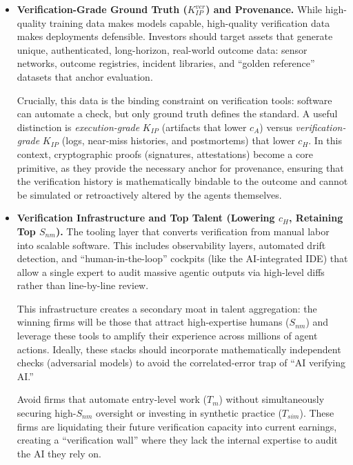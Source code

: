 \documentclass[12pt, letter]{article}
\begin{document}
\begin{itemize}

    \item \textbf{Verification-Grade Ground Truth ($K_{IP}^{ver}$) and Provenance.} While high-quality training data makes models capable, high-quality verification data makes deployments defensible. Investors should target assets that generate unique, authenticated, long-horizon, real-world outcome data: sensor networks, outcome registries, incident libraries, and ``golden reference'' datasets that anchor evaluation.

    Crucially, this data is the binding constraint on verification tools: software can automate a check, but only ground truth defines the standard. A useful distinction is \emph{execution-grade} $K_{IP}$ (artifacts that lower $c_A$) versus \emph{verification-grade} $K_{IP}$ (logs, near-miss histories, and postmortems) that lower $c_H$. In this context, cryptographic proofs (signatures, attestations) become a core primitive, as they provide the necessary anchor for provenance, ensuring that the verification history is mathematically bindable to the outcome and cannot be simulated or retroactively altered by the agents themselves.

    \item \textbf{Verification Infrastructure and Top Talent (Lowering $c_H$, Retaining Top $S_{nm}$).} The tooling layer that converts verification from manual labor into scalable software. This includes observability layers, automated drift detection, and ``human-in-the-loop'' cockpits (like the AI-integrated IDE) that allow a single expert to audit massive agentic outputs via high-level diffs rather than line-by-line review.

    This infrastructure creates a secondary moat in talent aggregation: the winning firms will be those that attract high-expertise humans ($S_{nm}$) and leverage these tools to amplify their experience across millions of agent actions. Ideally, these stacks should incorporate mathematically independent checks (adversarial models) to avoid the correlated-error trap of ``AI verifying AI.''

    Avoid firms that automate entry-level work ($T_m$) without simultaneously securing high-$S_{nm}$ oversight or investing in synthetic practice ($T_{sim}$). These firms are liquidating their future verification capacity into current earnings, creating a ``verification wall'' where they lack the internal expertise to audit the AI they rely on.


\end{itemize}
\end{document}
